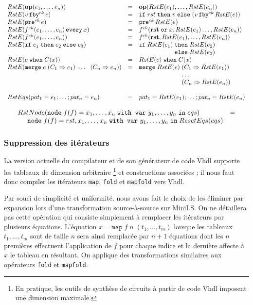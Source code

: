 \documentclass[a4paper]{article}
\newcommand{\minils}{{\sc MiniLS}}
\newcommand{\vhdl}{{\sc Vhdl}}
\newcommand{\mybox}[1]{\mbox{\tt{#1}}}
\newcommand{\ind}[0]{\hspace{0.5cm}}
\newcommand{\Node}[4]{\mybox{node} \; f(#1) = #2 \; \mybox{with var} \
  #3 \; \mybox{in} \; #4}
\newcommand{\Op}[2]{\mybox{\bf{op}}(#1,\dots,#2)}
\newcommand{\Fby}[2]{#1 \, \mybox{fby}^{ck} \, #2}
\newcommand{\Pre}[1]{\mybox{pre}^{ck} \, #1}
\newcommand{\Every}[4]{#1^{ck}(#2,\dots,#3) \, \mybox{every} \, #4}
\newcommand{\App}[2]{#1^{ck}(#2)}
\newcommand{\If}[3]{\mybox{if} \; #1 \; \mybox{then} \; #2 \; \mybox{else} \; #3}
\newcommand{\When}[3]{#1 \; \mybox{when} \; #2(#3)}
\newcommand{\Merge}[5]{\mybox{merge} \; #1 \; (#2 \Rightarrow #3) \; \dots \; \
  (#4 \Rightarrow #5)}
\newcommand{\Map}[3]{\mathtt{map} \; #1\; n\; (#2,\dots,#3)}
\begin{document}
\[
\begin{array}{lcl}
  \re{\Op{e_1}{e_n}} & = & \Op{\re{e_1}}{\re{e_n}} \\
  \re{\Fby{v}{e}} & = & \If{rst}{v}{(\Fby{v}{\re{e}})} \\
  \re{\Pre{e}} & = & \Pre{\re{e}} \\
  \re{\Every{f}{e_1}{e_n}{x}} & = & \App{f}{\mathbf{rst} \; \mathtt{or} \;
    x, \re{e_1} \dots, \re{e_n}} \\
  \re{\App{f}{e_1,\dots,e_n}} & = &
  \App{f}{\mathbf{rst},\re{e_1},\dots,\re{e_n}} \\
  \re{\If{e_1}{e_2}{e_3}} & = & \If{\re{e_1}}{\re{e_2}\\ & & \hspace{1.9cm}}
  {\re{e_3}} \\
  \re{\When{e}{C}{x}} & = & \When{\re{e}}{C}{x} \\
  \re{\Merge{e}{C_1}{e_1}{C_n}{e_n}} & = &
  \mybox{merge} \; \re{e} \; (C_1 \Rightarrow \re{e_1}) \\
  & & \hspace{2.4cm} \dots \\
  & & \hspace{2.4cm} (C_n \Rightarrow \re{e_n})
\\ \\
RstEqs(pat_1 = e_1;\dots;pat_n = e_n) & = &
  pat_1 = \re{e_1};\dots;pat_n = \re{e_n} \\
  \end{array}
\]

\[
\begin{array}{ll}
  \rstn{\Node{f}{x_1,\dots,x_n}{y_1,\dots,y_n}{eqs}} & = \\
  \ind \Node{f}{rst,x_1,\dots,x_n}{y_1,\dots,y_n}{ResetEqs(eqs)}
\end{array}
\]

\subsubsection{Suppression des it\'erateurs}

La version actuelle du compilateur et de son g\'en\'erateur de code \vhdl{} supporte
les tableaux de dimension arbitraire \footnote{En pratique, les outils de
  synth\`ese de circuits \`a partir de code \vhdl{} imposent une dimension maximale.}
et constructions associ\'ees ; il nous faut donc compiler les it\'erateurs
\texttt{map}, \texttt{fold} et \texttt{mapfold} vers \vhdl{}.

Par souci de simplicit\'e et uniformit\'e, nous avons fait le choix de les
\'eliminer par expansion lors d'une transformation source-\`a-source sur
\minils. On ne d\'etaillera pas cette op\'eration qui consiste simplement \`a
remplacer les it\'erateurs par plusieurs \'equations. L'\'equation $x =
\Map{f}{t_1}{t_m}$ lorsque les tableaux $t_1, \dots, t_m$ sont de taille $n$
sera ainsi remplac\'ee par $n + 1$ \'equations dont les $n$ premi\`eres
effectuent l'application de $f$ pour chaque indice et la derni\`ere affecte \`a
$x$ le tableau en r\'esultant. On applique des transformations similaires aux
op\'erateurs \texttt{fold} et \texttt{mapfold}.
\end{document}
